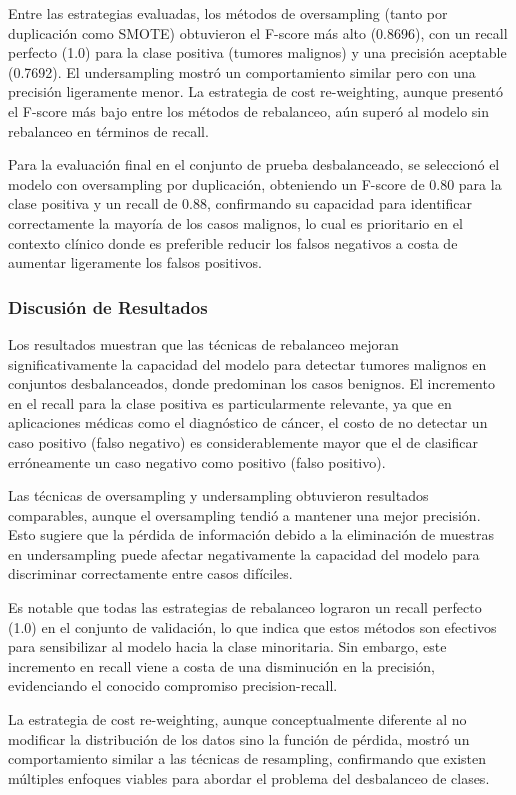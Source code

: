 Entre las estrategias evaluadas, los métodos de oversampling (tanto por duplicación como SMOTE) obtuvieron el F-score más alto (0.8696), con un recall perfecto (1.0) para la clase positiva (tumores malignos) y una precisión aceptable (0.7692). El undersampling mostró un comportamiento similar pero con una precisión ligeramente menor. La estrategia de cost re-weighting, aunque presentó el F-score más bajo entre los métodos de rebalanceo, aún superó al modelo sin rebalanceo en términos de recall.

Para la evaluación final en el conjunto de prueba desbalanceado, se seleccionó el modelo con oversampling por duplicación, obteniendo un F-score de 0.80 para la clase positiva y un recall de 0.88, confirmando su capacidad para identificar correctamente la mayoría de los casos malignos, lo cual es prioritario en el contexto clínico donde es preferible reducir los falsos negativos a costa de aumentar ligeramente los falsos positivos.

\subsubsection{Discusión de Resultados}

Los resultados muestran que las técnicas de rebalanceo mejoran significativamente la capacidad del modelo para detectar tumores malignos en conjuntos desbalanceados, donde predominan los casos benignos. El incremento en el recall para la clase positiva es particularmente relevante, ya que en aplicaciones médicas como el diagnóstico de cáncer, el costo de no detectar un caso positivo (falso negativo) es considerablemente mayor que el de clasificar erróneamente un caso negativo como positivo (falso positivo).

Las técnicas de oversampling y undersampling obtuvieron resultados comparables, aunque el oversampling tendió a mantener una mejor precisión. Esto sugiere que la pérdida de información debido a la eliminación de muestras en undersampling puede afectar negativamente la capacidad del modelo para discriminar correctamente entre casos difíciles.

Es notable que todas las estrategias de rebalanceo lograron un recall perfecto (1.0) en el conjunto de validación, lo que indica que estos métodos son efectivos para sensibilizar al modelo hacia la clase minoritaria. Sin embargo, este incremento en recall viene a costa de una disminución en la precisión, evidenciando el conocido compromiso precision-recall.

La estrategia de cost re-weighting, aunque conceptualmente diferente al no modificar la distribución de los datos sino la función de pérdida, mostró un comportamiento similar a las técnicas de resampling, confirmando que existen múltiples enfoques viables para abordar el problema del desbalanceo de clases.

